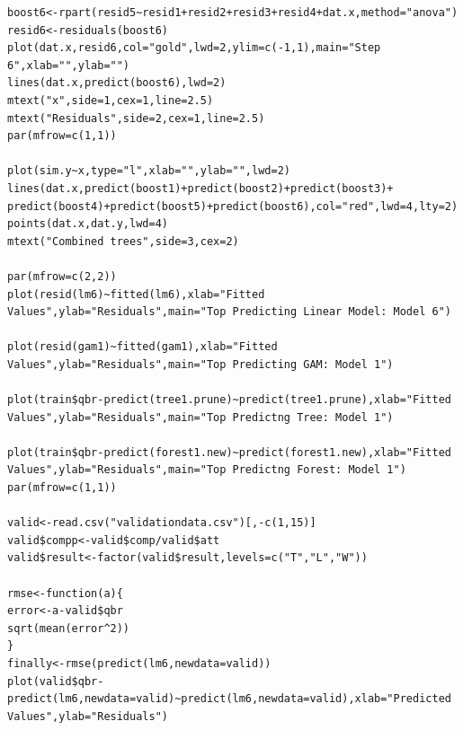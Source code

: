 \documentclass[12pt]{article}\usepackage[]{graphicx}\usepackage[]{color}
\begin{document}
\begin{lstlisting}
boost6<-rpart(resid5~resid1+resid2+resid3+resid4+dat.x,method="anova")
resid6<-residuals(boost6)
plot(dat.x,resid6,col="gold",lwd=2,ylim=c(-1,1),main="Step 6",xlab="",ylab="")
lines(dat.x,predict(boost6),lwd=2)
mtext("x",side=1,cex=1,line=2.5)
mtext("Residuals",side=2,cex=1,line=2.5)
par(mfrow=c(1,1))

plot(sim.y~x,type="l",xlab="",ylab="",lwd=2)
lines(dat.x,predict(boost1)+predict(boost2)+predict(boost3)+
predict(boost4)+predict(boost5)+predict(boost6),col="red",lwd=4,lty=2)
points(dat.x,dat.y,lwd=4)
mtext("Combined trees",side=3,cex=2)

par(mfrow=c(2,2))
plot(resid(lm6)~fitted(lm6),xlab="Fitted Values",ylab="Residuals",main="Top Predicting Linear Model: Model 6")

plot(resid(gam1)~fitted(gam1),xlab="Fitted Values",ylab="Residuals",main="Top Predicting GAM: Model 1")

plot(train$qbr-predict(tree1.prune)~predict(tree1.prune),xlab="Fitted Values",ylab="Residuals",main="Top Predictng Tree: Model 1")

plot(train$qbr-predict(forest1.new)~predict(forest1.new),xlab="Fitted Values",ylab="Residuals",main="Top Predictng Forest: Model 1")
par(mfrow=c(1,1))

valid<-read.csv("validationdata.csv")[,-c(1,15)]
valid$compp<-valid$comp/valid$att
valid$result<-factor(valid$result,levels=c("T","L","W"))

rmse<-function(a){
error<-a-valid$qbr
sqrt(mean(error^2))
}
finally<-rmse(predict(lm6,newdata=valid))
plot(valid$qbr-predict(lm6,newdata=valid)~predict(lm6,newdata=valid),xlab="Predicted Values",ylab="Residuals")

\end{lstlisting}
\end{document}

